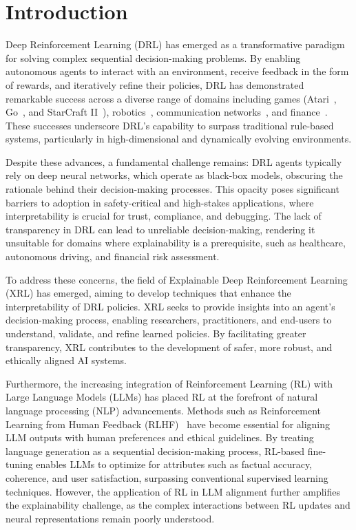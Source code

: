 \section{Introduction}

Deep Reinforcement Learning (DRL) has emerged as a transformative paradigm for solving complex sequential decision-making problems. By enabling autonomous agents to interact with an environment, receive feedback in the form of rewards, and iteratively refine their policies, DRL has demonstrated remarkable success across a diverse range of domains including games (\eg Atari~\citep{mnih2013playing,kaiser2020model}, Go~\citep{silver2018general,silver2017mastering}, and StarCraft II~\citep{vinyals2019grandmaster,vinyals2017starcraft}), robotics~\citep{kalashnikov2018scalable}, communication networks~\citep{feriani2021single}, and finance~\citep{liu2024dynamic}. These successes underscore DRL's capability to surpass traditional rule-based systems, particularly in high-dimensional and dynamically evolving environments.

Despite these advances, a fundamental challenge remains: DRL agents typically rely on deep neural networks, which operate as black-box models, obscuring the rationale behind their decision-making processes. This opacity poses significant barriers to adoption in safety-critical and high-stakes applications, where interpretability is crucial for trust, compliance, and debugging. The lack of transparency in DRL can lead to unreliable decision-making, rendering it unsuitable for domains where explainability is a prerequisite, such as healthcare, autonomous driving, and financial risk assessment.

To address these concerns, the field of Explainable Deep Reinforcement Learning (XRL) has emerged, aiming to develop techniques that enhance the interpretability of DRL policies. XRL seeks to provide insights into an agent’s decision-making process, enabling researchers, practitioners, and end-users to understand, validate, and refine learned policies. By facilitating greater transparency, XRL contributes to the development of safer, more robust, and ethically aligned AI systems.

Furthermore, the increasing integration of Reinforcement Learning (RL) with Large Language Models (LLMs) has placed RL at the forefront of natural language processing (NLP) advancements. Methods such as Reinforcement Learning from Human Feedback (RLHF)~\citep{bai2022training,ouyang2022training} have become essential for aligning LLM outputs with human preferences and ethical guidelines. By treating language generation as a sequential decision-making process, RL-based fine-tuning enables LLMs to optimize for attributes such as factual accuracy, coherence, and user satisfaction, surpassing conventional supervised learning techniques. However, the application of RL in LLM alignment further amplifies the explainability challenge, as the complex interactions between RL updates and neural representations remain poorly understood.

